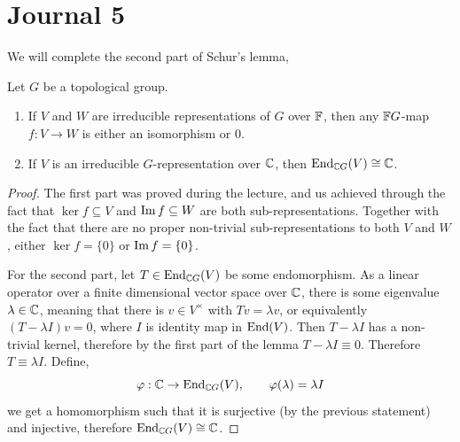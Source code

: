 \section{Journal 5}
We will complete the second part of Schur's lemma,
\begin{lemma}[Schur]
	Let $G$ be a topological group.
	\begin{enumerate}
		\item If $V$ and $W$ are irreducible representations of $G$ over $\mathbb{F}$,
			then any $\mathbb{F} G$-map $f : V \to W$ is either an isomorphism or $0$.
		\item If $V$ is an irreducible $G$-representation over $\mathbb{C}$, then $\operatorname{End}_{\mathbb{C} G}(V) \cong \mathbb{C}$.
	\end{enumerate}
\end{lemma}
\begin{proof}
	The first part was proved during the lecture, and us achieved through the fact that $\ker f \subseteq V$ and $\operatorname{Im} f \subseteq W$ are both sub-representations.
	Together with the fact that there are no proper non-trivial sub-representations to both $V$ and $W$, either $\ker f = \{ 0 \}$ or $\operatorname{Im} f = \{ 0 \}$.

	For the second part, let $T \in \operatorname{End}_{\mathbb{C} G}(V)$ be some endomorphism.
	As a linear operator over a finite dimensional vector space over $\mathbb{C}$, there is some eigenvalue $\lambda \in \mathbb{C}$, meaning that there is $v \in V^\times$ with $T v = \lambda v$,
	or equivalently $(T - \lambda I) v = 0$, where $I$ is identity map in $\operatorname{End}(V)$. Then $T - \lambda I$ has a non-trivial kernel, therefore by the first part of the lemma $T - \lambda I \equiv 0$.
	Therefore $T \equiv \lambda I$. Define,
	\[
		\varphi : \mathbb{C} \to \operatorname{End}_{\mathbb{C} G}(V),
		\qquad
		\varphi(\lambda)
		= \lambda I
	\]
	we get a homomorphism such that it is surjective (by the previous statement) and injective, therefore $\operatorname{End}_{\mathbb{C} G}(V) \cong \mathbb{C}$.
\end{proof}


